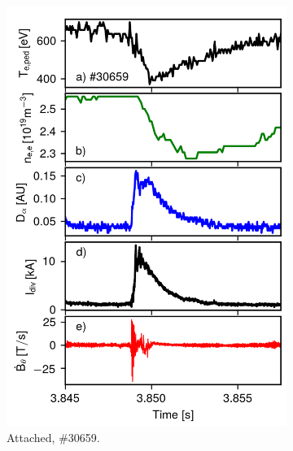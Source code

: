 \documentclass[12pt]{iopart}
\begin{document}
\begin{figure}[!hbt]
\centering
	\begin{subfigure}{3in}
    \includegraphics{ELM_cycle_30659.png}
	\caption{Attached, \#30659.}
	\end{subfigure}
	~
	\begin{subfigure}{3in}

\end{subfigure}
\end{figure}
\end{document}
